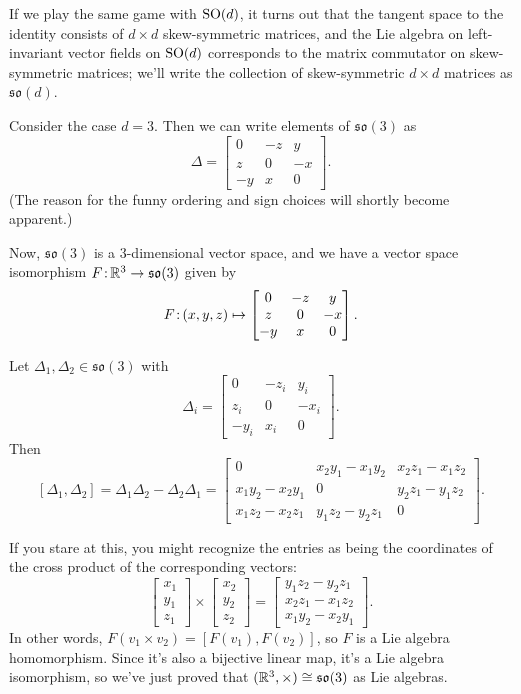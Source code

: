 \begin{example}
	If we play the same game with $\operatorname{SO}(d)$, it turns out that the tangent space to the identity consists of $d \times d$ skew-symmetric matrices, and the Lie algebra on left-invariant vector fields on $\operatorname{SO}(d)$ corresponds to the matrix commutator on skew-symmetric matrices; we'll write the collection of skew-symmetric $d \times d$ matrices as $\mathfrak{so}(d)$.
	
	Consider the case $d = 3$. Then we can write elements of $\mathfrak{so}(3)$ as 
	\[
		\Delta = \begin{bmatrix} 0 & -z & y \\ z & 0 & -x \\ -y & x & 0 \end{bmatrix}.
	\]
	(The reason for the funny ordering and sign choices will shortly become apparent.)
	
	Now, $\mathfrak{so}(3)$ is a 3-dimensional vector space, and we have a vector space isomorphism $F\colon\thinspace\!\! \mathbb{R}^3 \to \mathfrak{so}(3)$ given by
	\begin{equation}\label{eq:r3 so3 isomorphism}
		F \colon\thinspace\!\! (x,y,z) \mapsto \begin{bmatrix} 0 & -z & y \\ z & 0 & -x \\ -y & x & 0 \end{bmatrix}.
	\end{equation}
	
	Let $\Delta_1,\Delta_2 \in \mathfrak{so}(3)$ with 
	\[
		\Delta_i = \begin{bmatrix} 0 & -z_i & y_i \\ z_i & 0 & -x_i \\ -y_i & x_i & 0 \end{bmatrix}.
	\]
	Then
	\[
		[\Delta_1, \Delta_2] = \Delta_1 \Delta_2 - \Delta_2 \Delta_1 = \begin{bmatrix} 0 & x_2 y_1-x_1 y_2 & x_2 z_1-x_1 z_2 \\
 x_1 y_2-x_2 y_1 & 0 & y_2 z_1-y_1 z_2 \\
 x_1 z_2-x_2 z_1 & y_1 z_2-y_2 z_1 & 0 \end{bmatrix}.
	\]
	
	If you stare at this, you might recognize the entries as being the coordinates of the cross product of the corresponding vectors:
	\[
		\begin{bmatrix} x_1 \\ y_1 \\ z_1 \end{bmatrix} \times \begin{bmatrix} x_2 \\ y_2 \\ z_2 \end{bmatrix} = \begin{bmatrix} y_1 z_2-y_2 z_1 \\ x_2 z_1-x_1 z_2 \\ x_1 y_2-x_2 y_1 \end{bmatrix}.
	\]
	In other words, $F(v_1 \times v_2) = [F(v_1), F(v_2)]$, so $F$ is a Lie algebra homomorphism. Since it's also a bijective linear map, it's a Lie algebra isomorphism, so we've just proved that $(\mathbb{R}^3, \times) \cong \mathfrak{so}(3)$ as Lie algebras.
	

\end{example}

